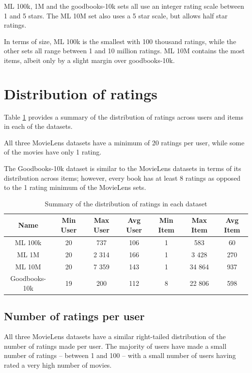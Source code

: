 ML 100k, 1M and the goodbooks-10k sets all use an integer rating scale between 1 and 5 stars. The ML 10M set also uses a 5 star scale, but allows half star ratings.

In terms of size, ML 100k is the smallest with 100 thousand ratings, while the other sets all range between 1 and 10 million ratings. ML 10M contains the most items, albeit only by a slight margin over goodbooks-10k.

\section{Distribution of ratings}
Table \ref{tab:ratings-distribution} provides a summary of the distribution of ratings across users and items in each of the datasets.

All three MovieLens datasets have a minimum of 20 ratings per user, while some of the movies have only 1 rating.

The Goodbooks-10k dataset is similar to the MovieLens datasets in terms of its distribution across items; however, every book has at least 8 ratings as opposed to the 1 rating minimum of the MovieLens sets.

\begin{table}[H]
\centering
\begin{tabular}{c | c | c | c | c | c | c}
\toprule
\textbf{Name} & \textbf{Min User} & \textbf{Max User} & \textbf{Avg User} & \textbf{Min Item} & \textbf{Max Item} & \textbf{Avg Item} \\
\midrule
ML 100k & 20 & 737 & 106 & 1 & 583 & 60 \\
ML 1M & 20 & 2 314 & 166 & 1 & 3 428 & 270 \\
ML 10M & 20 & 7 359 & 143 & 1 & 34 864 & 937 \\
Goodbooks-10k & 19 & 200 & 112 & 8 & 22 806 & 598 \\
\bottomrule
\end{tabular}
\caption[Ratings distribution]{Summary of the distribution of ratings in each dataset}
\label{tab:ratings-distribution}
\end{table}

\subsection{Number of ratings per user}
All three MovieLens datasets have a similar right-tailed distribution of the number of ratings made per user. The majority of users have made a small number of ratings -- between 1 and 100 -- with a small number of users having rated a very high number of movies.


